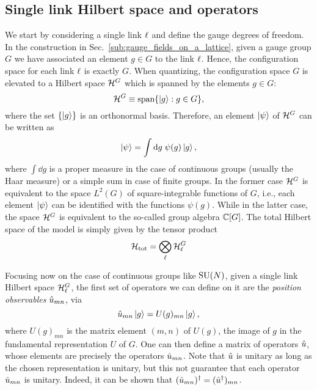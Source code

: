 \subsection{Single link Hilbert space and operators}
\label{sub:single_link_hilbert_space_and_operators}

We start by considering a single link $\ell$ and define the gauge degrees of freedom.
In  the construction in Sec.~\ref{sub:gauge_fields_on_a_lattice}, given a gauge group $G$ we have associated an element $g \in G$ to the link $\ell$.
Hence, the configuration space for each link $\ell$ is exactly $G$.
When quantizing, the configuration space $G$ is elevated to a Hilbert space $\mathcal{H}^G$ which is spanned by the elements $g \in G$:
\begin{equation}
    \mathcal{H}^G \equiv \text{span}\{\ket{g} : g \in G\},
    \label{eq:single_link_Hilbert_space}
\end{equation}
where the set $\{\ket{g}\}$ is an orthonormal basis.
Therefore, an element $\ket{\psi}$ of $\mathcal{H}^G$ can be written as
\begin{equation}
    \ket{\psi} = \int \text{d} g \; \psi(g) \ket{g},
\end{equation}
where $\int \dd g$ is a proper measure in the case of continuous groups (usually the Haar measure) or a simple sum in case of finite groups.
In the former case $\mathcal{H}^G$ is equivalent to the space $L^2(G)$ of square-integrable functions of $G$, i.e., each element $\ket{\psi}$ can be identified with the functions $\psi(g)$.
While in the latter case, the space $\mathcal{H}^G$ is equivalent to the so-called group algebra $\mathbb{C}[G]$.
The total Hilbert space of the model is simply given by the tensor product
\begin{equation}
    \mathcal{H}_{\text{tot}} = \bigotimes_{\ell} \mathcal{H}^G_{\ell}
\end{equation}


Focusing now on the case of continuous groups like $\text{SU}(N)$,
given a single link Hilbert space $\mathcal{H}^G_{\ell}$, the first set of operators we can define on it are the \emph{position observables} $\hat{u}_{mn}$, via
\begin{equation}
    \hat{u}_{mn} \ket{g} = U(g)_{mn} \ket{g},
\end{equation}
where $U(g)_{mn}$ is the matrix element $(m, n)$ of $U(g)$, the image of $g$ in the fundamental representation $U$ of $G$.
One can then define a matrix of operators $\hat{u}$, whose elements are precisely the operators $\hat{u}_{mn}$.
Note that $\hat{u}$ is unitary as long as the chosen representation is unitary, but this not guarantee that each operator $\hat{u}_{mn}$ is unitary.
Indeed, it can be shown that $(\hat{u}_{mn})^{\dagger} = (\hat{u}^{\dagger})_{mn}$.

